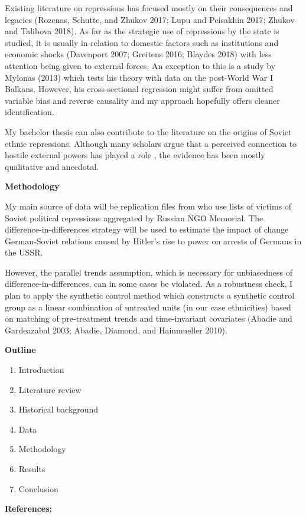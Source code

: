 \noindent Existing literature on repressions has focused mostly on their consequences and legacies (Rozenas, Schutte, and Zhukov 2017; Lupu and Peisakhin 2017; Zhukov and Talibova 2018). As far as the strategic use of repressions by the state is studied, it is usually in relation to domestic factors such as institutions and economic shocks (Davenport 2007; Greitens 2016; Blaydes 2018) with less attention being given to external forces. An exception to this is a study by Mylonas (2013) which tests his theory with data on the post-World War I Balkans. However, his cross-sectional regression might suffer from omitted variable bias and reverse causality and my approach hopefully offers cleaner identification. 

My bachelor thesis can also contribute to the literature on the origins of Soviet ethnic repressions. Although many scholars argue that a perceived connection to hostile external powers has played a role \citep{martin_origins_1998, polian_against_2003}, the evidence has been mostly qualitative and anecdotal. 

\noindent \large{\bf Methodology}

\noindent My main source of data will be replication files from \citet{zhukov_stalins_2018} who use lists of victims of Soviet political repressions aggregated by Russian NGO Memorial. The difference-in-differences strategy will be used to estimate the impact of change German-Soviet relations caused by Hitler’s rise to power on arrests of Germans in the USSR. 

However, the parallel trends assumption, which is necessary for unbiasedness of difference-in-differences, can in some cases be violated. As a robustness check, I plan to apply the synthetic control method which constructs a synthetic control group as a linear combination of untreated units (in our case ethnicities) based on matching of pre-treatment trends and time-invariant covariates %
(Abadie and Gardeazabal 2003; Abadie, Diamond, and Hainmueller 2010). 

\noindent \large{\bf  Outline}
\begin{enumerate}
\item Introduction
 \item Literature review 
 \item Historical background
 \item Data
 \item Methodology
 \item Results
 \item Conclusion 
\end{enumerate}
\medskip
\large{\bf References:}
\printbibliography[keyword=major, heading=none]

